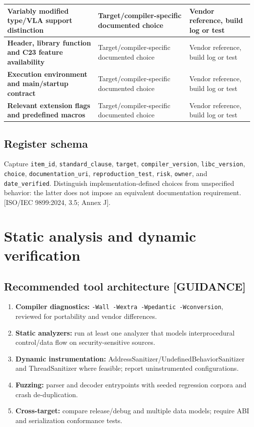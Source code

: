 \documentclass[10pt,letterpaper,oneside]{report}
\newcommand{\refcl}[1]{\textsf{\footnotesize[ISO/IEC 9899:2024, #1]}}
\begin{document}
\begin{longtable}{p{.34\linewidth}p{.30\linewidth}p{.28\linewidth}}
\textbf{Variably modified type/VLA support distinction} & Target/compiler-specific documented choice & Vendor reference, build log or test\\\hline
\textbf{Header, library function and C23 feature availability} & Target/compiler-specific documented choice & Vendor reference, build log or test\\\hline
\textbf{Execution environment and main/startup contract} & Target/compiler-specific documented choice & Vendor reference, build log or test\\\hline
\textbf{Relevant extension flags and predefined macros} & Target/compiler-specific documented choice & Vendor reference, build log or test\\\hline
\bottomrule\end{longtable}\normalsize
\section{Register schema}
Capture \texttt{item\_id}, \texttt{standard\_clause}, \texttt{target}, \texttt{compiler\_version}, \texttt{libc\_version}, \texttt{choice}, \texttt{documentation\_uri}, \texttt{reproduction\_test}, \texttt{risk}, \texttt{owner}, and \texttt{date\_verified}. Distinguish implementation-defined choices from unspecified behavior: the latter does not impose an equivalent documentation requirement. \refcl{3.5; Annex J}.
\chapter{Static analysis and dynamic verification}
\section{Recommended tool architecture [GUIDANCE]}
\begin{enumerate}
\item \textbf{Compiler diagnostics:} \texttt{-Wall -Wextra -Wpedantic -Wconversion}, reviewed for portability and vendor differences.
\item \textbf{Static analyzers:} run at least one analyzer that models interprocedural control/data flow on security-sensitive sources.
\item \textbf{Dynamic instrumentation:} AddressSanitizer/UndefinedBehaviorSanitizer and ThreadSanitizer where feasible; report uninstrumented configurations.
\item \textbf{Fuzzing:} parser and decoder entrypoints with seeded regression corpora and crash de-duplication.
\item \textbf{Cross-target:} compare release/debug and multiple data models; require ABI and serialization conformance tests.
\end{enumerate}
\end{document}
